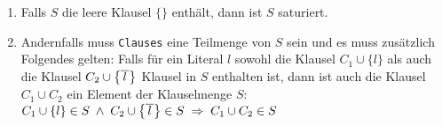 \begin{enumerate}
\item Falls $S$ die leere Klausel $\{\}$ enthält, dann ist $S$ saturiert.
\item Andernfalls muss \texttt{Clauses} eine Teilmenge von $S$ sein und es muss zusätzlich Folgendes
      gelten: Falls für ein Literal $l$ sowohl die Klausel $C_1 \cup \{ l \}$ als auch die Klausel $C_2 \cup
      \bigl\{ \overline{\,l\,} \bigr\}$ Klausel in $S$
      enthalten ist, dann ist auch die Klausel $C_1 \cup C_2$ ein Element der Klausel\-menge $S$:
      \\[0.2cm]
      \hspace*{1.3cm}
      $C_1 \cup \{ l \} \in S \;\wedge\; C_2 \cup \bigl\{ \overline{\,l\,} \bigr\} \in S \;\Rightarrow\; C_1 \cup C_2 \in S$ 
\end{enumerate}

